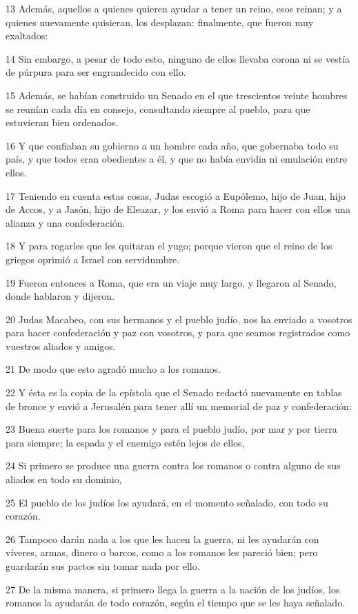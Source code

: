 \par 13 Además, aquellos a quienes quieren ayudar a tener un reino, esos reinan; y a quienes nuevamente quisieran, los desplazan: finalmente, que fueron muy exaltados:
\par 14 Sin embargo, a pesar de todo esto, ninguno de ellos llevaba corona ni se vestía de púrpura para ser engrandecido con ello.
\par 15 Además, se habían construido un Senado en el que trescientos veinte hombres se reunían cada día en consejo, consultando siempre al pueblo, para que estuvieran bien ordenados.
\par 16 Y que confiaban su gobierno a un hombre cada año, que gobernaba todo su país, y que todos eran obedientes a él, y que no había envidia ni emulación entre ellos.
\par 17 Teniendo en cuenta estas cosas, Judas escogió a Eupólemo, hijo de Juan, hijo de Accos, y a Jasón, hijo de Eleazar, y los envió a Roma para hacer con ellos una alianza y una confederación.
\par 18 Y para rogarles que les quitaran el yugo; porque vieron que el reino de los griegos oprimió a Israel con servidumbre.
\par 19 Fueron entonces a Roma, que era un viaje muy largo, y llegaron al Senado, donde hablaron y dijeron.
\par 20 Judas Macabeo, con sus hermanos y el pueblo judío, nos ha enviado a vosotros para hacer confederación y paz con vosotros, y para que seamos registrados como vuestros aliados y amigos.
\par 21 De modo que esto agradó mucho a los romanos.
\par 22 Y ésta es la copia de la epístola que el Senado redactó nuevamente en tablas de bronce y envió a Jerusalén para tener allí un memorial de paz y confederación:
\par 23 Buena suerte para los romanos y para el pueblo judío, por mar y por tierra para siempre; la espada y el enemigo estén lejos de ellos,
\par 24 Si primero se produce una guerra contra los romanos o contra alguno de sus aliados en todo su dominio,
\par 25 El pueblo de los judíos los ayudará, en el momento señalado, con todo su corazón.
\par 26 Tampoco darán nada a los que les hacen la guerra, ni les ayudarán con víveres, armas, dinero o barcos, como a los romanos les pareció bien; pero guardarán sus pactos sin tomar nada por ello.
\par 27 De la misma manera, si primero llega la guerra a la nación de los judíos, los romanos la ayudarán de todo corazón, según el tiempo que se les haya señalado.
